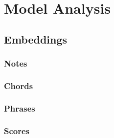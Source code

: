 \chapter{Model Analysis}

\section{Embeddings}

\subsection{Notes}

\subsection{Chords}

\subsection{Phrases}

\subsection{Scores}

